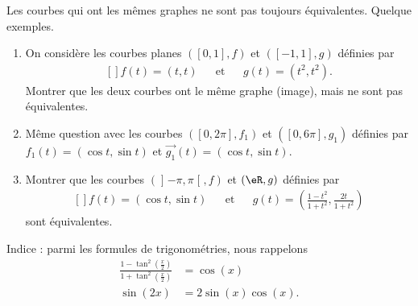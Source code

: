 \begin{exercice}\label{exoCourbesSurfaces0001}

	Les courbes qui ont les mêmes graphes ne sont pas toujours équivalentes. Quelque exemples.
	\begin{enumerate}
		\item
 On considère les courbes planes $([0,1], f)$ et  $([-1,1], g)$ définies par
 \begin{equation}
	 \begin{aligned}[]
		 f(t) = (t, t) &&\text{et}&& g(t)= (t^2, t^2).
	 \end{aligned}
 \end{equation}
Montrer que les deux courbes ont le même graphe (image), mais ne sont pas équivalentes.

\item
Même question avec les courbes $([0, 2 \pi], f_1)$ et  $([0, 6\pi], g_1)$ définies par $ f_1(t) = (\cos t, \sin t)$   et $ \vec{g_1}(t)= (\cos t, \sin t).$

\item
Montrer que les courbes $(\mathopen] -\pi , \pi \mathclose[, f)$ et $(\eR, g)$ définies par 
\begin{equation}
	\begin{aligned}[]
		f (t) = ( \cos t, \sin t) &&\text{et}&&  g(t) = \left( \frac{1-t^2}{1 + t^2}, \frac{ 2t}{ 1 + t^2} \right)
	\end{aligned}
\end{equation}
sont équivalentes.
			
	\end{enumerate}

    Indice : parmi les formules de trigonométries, nous rappelons 
    \begin{subequations}
        \begin{align}
            \frac{ 1-\tan^2\left( \frac{ x }{ 2 } \right) }{ 1+\tan^2\left( \frac{ x }{2} \right) }&=\cos(x)\\
            \sin(2x)&=2\sin(x)\cos(x).
        \end{align}
    \end{subequations}

\end{exercice}
